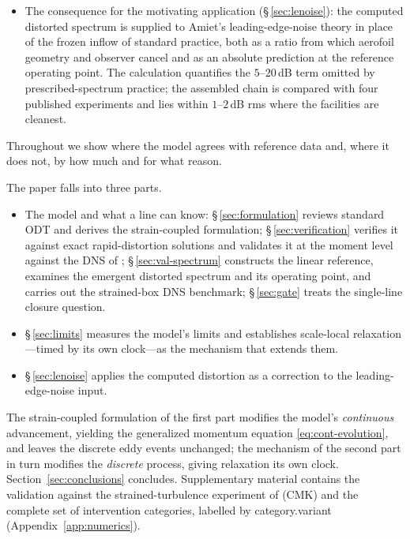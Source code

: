 \documentclass[lineno]{JFM-FLM_Au}
\begin{document}
\begin{itemize}
\item The consequence for the motivating application
(\S\,\ref{sec:lenoise}): the computed distorted spectrum is supplied to
Amiet's leading-edge-noise theory in place of the frozen inflow of standard
practice, both as a ratio from which aerofoil geometry and observer cancel
and as an absolute prediction at the reference operating point. The
calculation quantifies the $5$--$20$\,dB term omitted by prescribed-spectrum
practice; the assembled chain is compared with four published experiments
and lies within $1$--$2$\,dB rms where the facilities are cleanest.
\end{itemize}
Throughout we show where the model agrees with reference data and, where it
does not, by how much and for what reason.


The paper falls into three parts.
\begin{itemize}
\item The model and what a line can know: \S\,\ref{sec:formulation}
reviews standard ODT and derives the strain-coupled formulation;
\S\,\ref{sec:verification} verifies it against exact rapid-distortion
solutions and validates it at the moment level against the DNS of
\citet{LeeReynolds1985}; \S\,\ref{sec:val-spectrum} constructs the linear
reference, examines the emergent distorted spectrum and its operating
point, and carries out the strained-box DNS benchmark; \S\,\ref{sec:gate}
treats the single-line closure question.

\item \S\,\ref{sec:limits} measures the model's limits and establishes
scale-local relaxation---timed by its own clock---as the mechanism that
extends them.

\item \S\,\ref{sec:lenoise} applies the computed distortion as a
correction to the leading-edge-noise input.
\end{itemize}
The strain-coupled formulation of the first part modifies the model's
\emph{continuous} advancement, yielding the generalized momentum
equation \eqref{eq:cont-evolution}, and leaves the discrete eddy events
unchanged; the mechanism of the second part in turn modifies the
\emph{discrete} process, giving relaxation its own clock.
Section~\ref{sec:conclusions} concludes. Supplementary material contains
the validation against the strained-turbulence experiment of
\citet{ChenMeneveauKatz2006} (CMK) and the complete set of intervention categories, labelled by category.variant (Appendix~\ref{app:numerics}).
\end{document}
